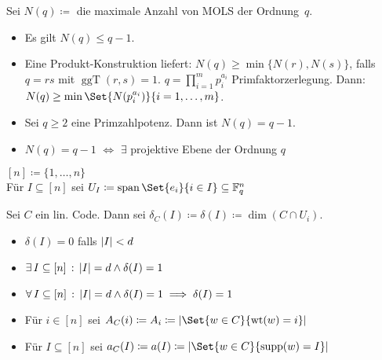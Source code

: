 \documentclass{cheat-sheet}
\newcommand{\F}{\mathbb{F}} %
\DeclareMathOperator{\wt}{wt} %
\DeclareMathOperator{\spann}{span} %
\DeclareMathOperator{\ggT}{ggT} %
\begin{document}
\begin{bem}
  Sei $N(q) \coloneqq $ die maximale Anzahl von MOLS der Ordnung~$q$.
  \begin{itemize}
    \item Es gilt $N(q) \leq q - 1$.
    \item Eine Produkt-Konstruktion liefert: $N(q) \geq \min \{ N(r), N(s) \}$, falls $q = rs$ mit $\ggT(r, s) = 1$.
    $q = \prod_{i=1}^m p_i^{a_i}$ Primfaktorzerlegung.
    Dann: $N(q) \geq \min \Set{N(p_i^{a_i})}{i = 1, \ldots, m}$.
    \item Sei $q \geq 2$ eine Primzahlpotenz. Dann ist $N(q) = q-1$.
    \item $N(q) = q - 1$ $\iff$ $\exists$ projektive Ebene der Ordnung $q$
  \end{itemize}
\end{bem}



\begin{nota}
  $[n] \coloneqq \{ 1, \ldots, n \}$ \\
  Für $I \subseteq [n]$ sei $U_I \coloneqq \spann \Set{e_i}{i \in I} \subseteq \F_q^n$
\end{nota}


\begin{defn}
  Sei $C$ ein lin. Code.
  Dann sei $\delta_C(I) \coloneqq \delta(I) \coloneqq \dim(C \cap U_i)$.
\end{defn}

\begin{prop}
  \begin{itemize}
    \item $\delta(I) = 0$ falls $\lvert I\rvert < d$
    \item $\exists \, {I \subseteq [n]} \,:\, \lvert I\rvert = d \wedge \delta(I) = 1$
    \item $\forall \, {I \subseteq [n]} \,:\, \lvert I\rvert = d \wedge \delta(I) = 1 \implies \delta(I) = 1$
  \end{itemize}
\end{prop}

\begin{defn}
  \begin{minipage}[t]{0.88 \linewidth}
    \begin{itemize}
      \item Für $i \in [n]$ sei $A_C(i) \coloneqq A_i \coloneqq \abs{\Set{w \in C}{\wt(w) = i}}$
      \item Für $I \subseteq [n]$ sei $a_C(I) \coloneqq a(I) \coloneqq \abs{\Set{w \in C}{\supp(w) = I}}$
    \end{itemize}
  \end{minipage}
\end{defn}
\end{document}
